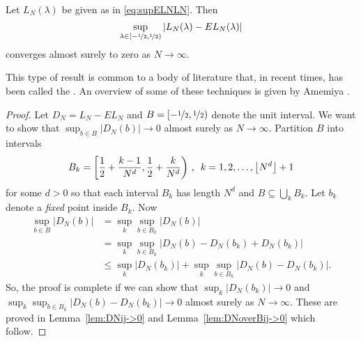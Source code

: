 \documentclass[journal]{../bib/IEEEtran}
\begin{document}
\begin{lemma}\label{lem:limsupSandES}
Let $L_N(\lambda)$ be given as in \eqref{eq:supELNLN}. Then 
\[
\sup_{\lambda \in [-\nicefrac{1}{2}, \nicefrac{1}{2})}| L_N(\lambda) - EL_N(\lambda) |
\] 
converges almost surely to zero as $N \rightarrow \infty$.
\end{lemma}
This type of result is common to a body of literature that, in recent times, has been called the . An overview of some of these techniques is given by Amemiya \cite[Ch.~4]{amemiya1985advanced}.
\begin{proof}
Let $D_N = L_N - EL_N$ and $B = [-\nicefrac{1}{2},\nicefrac{1}{2})$ denote the unit interval. We want to show that $\sup_{b \in B} \vert D_N(b) \vert \rightarrow 0$ almost surely as $N\rightarrow \infty$. Partition $B$ into intervals
\[
B_k = \left[\frac{1}{2} + \frac{k-1}{N^{d}}, \frac{1}{2} + \frac{k}{N^{d} }\right) \,, \,\,\, k = 1,2,\dots,{\left\lfloor N^d \right\rfloor} + 1
\]
for some $d > 0$ so that each interval $B_k$ has length $N^{d}$ and $B \subseteq \bigcup_{k}B_k$.  Let $b_k$ denote a \emph{fixed} point inside $B_k$. Now
\begin{align*}
\sup_{b \in B}\vert D_N(b) \vert &= \sup_{k}\sup_{b \in B_k}\vert D_N(b) \vert \\
&= \sup_{k}\sup_{b \in B_k}\vert D_N(b) - D_N(b_k) + D_N(b_k)\vert \\
&\leq \sup_{k}\vert D_N(b_k)\vert + \sup_{k}\sup_{b \in B_k}\vert D_N(b) - D_N(b_k)\vert.
\end{align*}
So, the proof is complete if we can show that $\sup_{k}\vert D_N(b_k)\vert \rightarrow 0$ and $\sup_{k}\sup_{b \in B_k}\vert D_N(b) - D_N(b_k)\vert \rightarrow 0$ almost surely as $N\rightarrow \infty$.  These are proved in Lemma~\ref{lem:DNij->0} and Lemma~\ref{lem:DNoverBij->0} which follow.
\end{proof}
\end{document}

